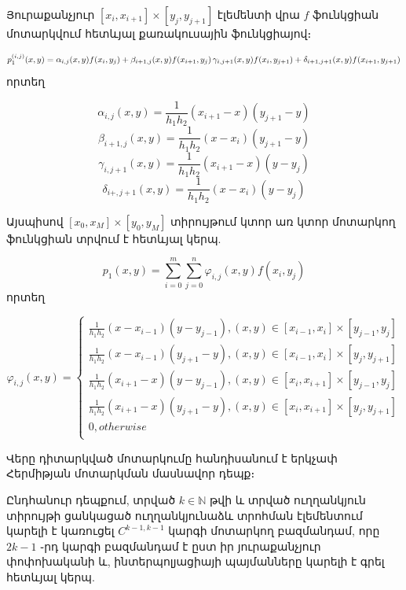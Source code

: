 \documentclass[fleqn, bachelor,subf,12pt,notitlepage]{disser}
\newcommand\scalemath[2]{\scalebox{#1}{\mbox{\ensuremath{\displaystyle #2}}}}
\begin{document}
Յուրաքանչյուր  $\left[x_{i}, x_{i+1}\right] \times \left[y_{j}, y_{j+1}\right]$ էլեմենտի վրա $f$ ֆունկցիան մոտարկվում հետևյալ քառակուսային ֆունկցիայով։

$$\scalemath{0.9}{p_{1}^{(i, j)}(x, y)=\alpha_{i,j}(x,y)f(x_{i},y_{j})+\beta_{i+1,j}(x,y)f(x_{i+1},y_{j})\scalemath{0.2}+\gamma_{i,j+1}(x,y) f(x_{i},y_{j+1})+\delta_{i+1, j+1}(x,y)f(x_{i+1},y_{j+1})}$$
 որտեղ 

$$\alpha_{i,j}(x,y)=\dfrac{1}{h_{1}h_{2}}\left(x_{i+1}-x\right)\left(y_{j+1}-y\right)$$
$$\beta_{i+1,j}(x,y)=\dfrac{1}{h_{1}h_{2}}\left(x-x_{i}\right)\left(y_{j+1}-y\right)$$
$$\gamma_{i,j+1}(x,y)=\dfrac{1}{h_{1}h_{2}}\left(x_{i+1}-x\right)\left(y-y_{j}\right)$$
$$\delta_{i+,j+1}(x,y)=\dfrac{1}{h_{1}h_{2}}\left(x-x_{i}\right)\left(y-y_{j}\right)$$

Այսպիսով $\left[x_{0}, x_{M}\right] \times \left[y_{0}, y_{M}\right]$ տիրույթում կտոր առ կտոր մոտարկող ֆունկցիան տրվում է հետևյալ կերպ.

$$p_{1}(x,y)=\sum_{i=0}^{m}\sum_{j=0}^{n}\varphi_{i,j}(x,y)f(x_{i},y_{j})$$
որտեղ


$$\varphi_{i,j}\left(x, y\right)=\begin{cases}
\frac{1}{h_{1}h_{2}}\left(x-x_{i-1}\right)\left(y-y_{j-1}\right), (x,y)\in \left[x_{i-1}, x_{i}\right]\times\left[y_{j-1}, y_{j}\right]\\
\frac{1}{h_{1}h_{2}}\left(x-x_{i-1}\right)\left(y_{j+1}-y\right), (x,y)\in \left[x_{i-1}, x_{i}\right]\times\left[y_{j}, y_{j+1}\right]\\
\frac{1}{h_{1}h_{2}}\left(x_{i+1}-x\right)\left(y-y_{j-1}\right), (x,y)\in \left[x_{i}, x_{i+1}\right]\times\left[y_{j-1}, y_{j}\right]\\
\frac{1}{h_{1}h_{2}}\left(x_{i+1}-x\right)\left(y_{j+1}-y\right), (x,y)\in \left[x_{i}, x_{i+1}\right]\times\left[y_{j}, y_{j+1}\right]\\
0, otherwise\\
\end{cases}$$

Վերը դիտարկված մոտարկումը հանդիսանում է երկչափ Հերմիթյան մոտարկման մասնավոր դեպք։

Ընդհանուր դեպքում, տրված $k\in \mathbb{N}$ թվի և տրված ուղղանկյուն տիրույթի ցանկացած ուղղանկյունաձև տրոհման էլեմենտում կարելի է կառուցել $C^{k-1, k-1}$ կարգի մոտարկող բազմանդամ, որը $2k-1$ ֊րդ կարգի բազմանդամ է ըստ իր յուրաքանչյուր փոփոխականի և, ինտերպոլյացիայի պայմանները կարելի է գրել հետևյալ կերպ.
\end{document}
